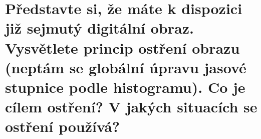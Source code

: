 \section{Představte si, že máte k dispozici již sejmutý digitální obraz. Vysvětlete princip ostření obrazu (neptám se 
globální úpravu jasové stupnice podle histogramu). Co je cílem ostření? V jakých situacích se ostření používá?}